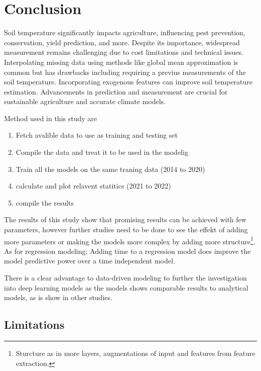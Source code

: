 \section{Conclusion}


Soil temperature significantly impacts agriculture, influencing pest prevention, conservation, yield prediction, and more. Despite its importance, widespread measurement remains challenging due to cost limitations and technical issues. Interpolating missing data using methods like global mean approximation is common but has drawbacks including requiring a previus measurements of the soil temperature. Incorporating exogenous features can improve soil temperature estimation. Advancements in prediction and measurement are crucial for sustainable agriculture and accurate climate models.

Method used in this study are
\begin{enumerate}
	\item Fetch avalible data to use as training and testing set
	\item Compile the data and treat it to be used in the modelig
	\item Train all the models on the same traning data (2014 to 2020)
	\item calculate and plot relavent statitics (2021 to 2022)
	\item compile the results
\end{enumerate} 

The results of this study show that promising results can be achieved with few parameters, however further studies need to be done to see the effekt of adding more parameters or making the models more complex by adding more structure\footnote{Sturcture as in more layers, augmentations of input and features from feature extraction.}. As for regression modeling; Adding time to a regression model does improve the model predictive power over a time independent model.

There is a clear advantage to data-driven modeling to further the investigation into deep learning models as the models shows comparable results to analytical models, as is show in other studies\cite{feng_estimation_2019,li_attention-aware_2022,li_modeling_2020}. 

\subsection{Limitations}

